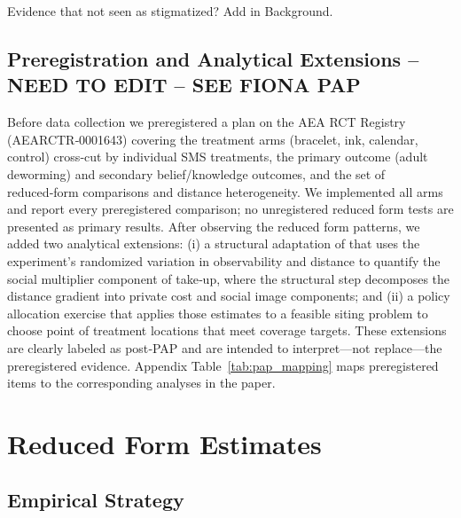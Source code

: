 \documentclass[12pt,a4paper]{article}
\begin{document}
Evidence that not seen as stigmatized? Add in Background. 








\subsection{Preregistration and Analytical Extensions -- NEED TO EDIT -- SEE FIONA PAP}\label{sec:prereg}  
Before data collection we preregistered a plan on the AEA RCT Registry (AEARCTR‑0001643) covering the treatment arms (bracelet, ink, calendar, control) cross‑cut by individual SMS treatments, the primary outcome (adult deworming) and secondary belief/knowledge outcomes, and the set of reduced‑form comparisons and distance heterogeneity. We implemented all arms and report every preregistered comparison; no unregistered reduced form tests are presented as primary results. After observing the reduced form patterns, we added two analytical extensions: (i) a structural adaptation of \citet{Benabou_laws_2011} that uses the experiment’s randomized variation in observability and distance to quantify the social multiplier component of take‑up, where the structural step decomposes the distance gradient into private cost and social image components; and (ii) a policy allocation exercise that applies those estimates to a feasible siting problem to choose point of treatment locations that meet coverage targets. These extensions are clearly labeled as post‑PAP and are intended to interpret—not replace—the preregistered evidence. Appendix Table~\ref{tab:pap_mapping} maps preregistered items to the corresponding analyses in the paper.

%
\section{Reduced Form Estimates} \label{reduced-form-results}

\subsection{Empirical Strategy}
\end{document}
